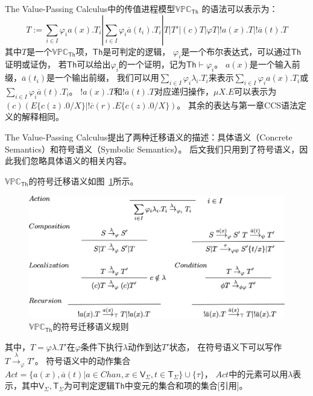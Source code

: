 The Value-Passing Calculus中的传值进程模型$\mathbb{VPC}_{\mathsf{Th}}$
的语法可以表示为：
\begin{equation}\label{eq:vpc}
   T:=\sum_{i\in I}\varphi_i a(x).T_i|\sum_{i\in I}\varphi_i\overline{a}(t_i).T_i|T|T'|(c)T|\varphi T|!a(x).T|!\overline{a}(t).T
\end{equation}
其中$T$是一个$\mathbb{VPC}_{\mathsf{Th}}$项，$\mathsf{Th}$是可判定的逻辑，
$\varphi_i$是一个布尔表达式，可以通过$\mathsf{Th}$证明或证伪，
若$\mathsf{Th}$可以给出$\varphi_i$的一个证明，记为$\mathsf{Th}\vdash \varphi_i$。
$a(x)$是一个输入前缀，$\overline{a}(t_i)$是一个输出前缀，
我们可以用$\sum_{i\in I}\varphi_i\lambda_i.T_i$来表示$\sum_{i\in I}\varphi_i a(x).T_i$或$\sum_{i\in I}\varphi_i \overline{a}(t).T_i$。
$!a(x).T$和$!\overline{a}(t).T$对应递归操作，$\mu X.E$可以表示为
$(c)(E\{c(z).0/X\}|!\overline{c}(r).E\{c(z).0/X\})$。
其余的表达与第一章CCS语法定义的解释相同。

The Value-Passing Calculus提出了两种迁移语义的描述：具体语义（Concrete Semantics）和符号语义（Symbolic Semantics）。
后文我们只用到了符号语义，因此我们忽略具体语义的相关内容。

$\mathbb{VPC}_{\mathsf{Th}}$的符号迁移语义如图~\ref{fig_vpc}所示。

\begin{figure}[!htbp]
   \small
   \centering
   \includegraphics[width=13cm]{../figures/vpc.png}
    \caption[]{$\mathbb{VPC}_{\mathsf{Th}}$的符号迁移语义规则}
    \label{fig_vpc}
\end{figure}
其中，$T=\varphi \lambda.T'$在$\varphi$条件下执行$\lambda$动作到达$T'$状态，
在符号语义下可以写作$T\stackrel{\lambda}{\rightarrow}_{\varphi}T'$。
符号语义中的动作集合$Act=\{a(x),\overline{a}(t)| a\in Chan, x\in \mathsf{V}_{\Sigma}, t\in \mathsf{T}_{\Sigma}\}\cup \{\tau\}$，
$Act$中的元素可以用$\lambda$表示，其中$\mathsf{V}_{\Sigma},\mathsf{T}_{\Sigma}$为可判定逻辑$\mathsf{Th}$中变元的集合和项的集合[引用]。

